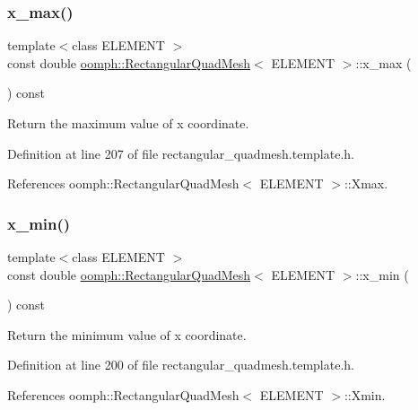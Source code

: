 \subsubsection{\texorpdfstring{x\+\_\+max()}{x\_max()}}
{\footnotesize\ttfamily template$<$class E\+L\+E\+M\+E\+NT $>$ \\
const double \hyperlink{classoomph_1_1RectangularQuadMesh}{oomph\+::\+Rectangular\+Quad\+Mesh}$<$ E\+L\+E\+M\+E\+NT $>$\+::x\+\_\+max (\begin{DoxyParamCaption}{ }\end{DoxyParamCaption}) const\hspace{0.3cm}{\ttfamily [inline]}}



Return the maximum value of x coordinate. 



Definition at line 207 of file rectangular\+\_\+quadmesh.\+template.\+h.



References oomph\+::\+Rectangular\+Quad\+Mesh$<$ E\+L\+E\+M\+E\+N\+T $>$\+::\+Xmax.

\mbox{\label{classoomph_1_1RectangularQuadMesh_ab311c3bec7f9f721bae1f93e0798ab2c}} 
\subsubsection{\texorpdfstring{x\+\_\+min()}{x\_min()}}
{\footnotesize\ttfamily template$<$class E\+L\+E\+M\+E\+NT $>$ \\
const double \hyperlink{classoomph_1_1RectangularQuadMesh}{oomph\+::\+Rectangular\+Quad\+Mesh}$<$ E\+L\+E\+M\+E\+NT $>$\+::x\+\_\+min (\begin{DoxyParamCaption}{ }\end{DoxyParamCaption}) const\hspace{0.3cm}{\ttfamily [inline]}}



Return the minimum value of x coordinate. 



Definition at line 200 of file rectangular\+\_\+quadmesh.\+template.\+h.



References oomph\+::\+Rectangular\+Quad\+Mesh$<$ E\+L\+E\+M\+E\+N\+T $>$\+::\+Xmin.

